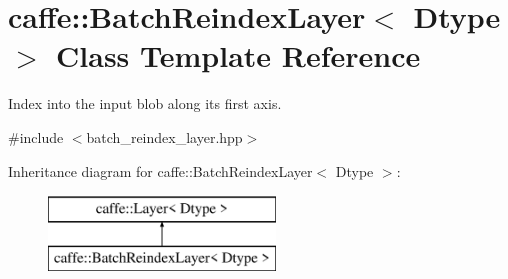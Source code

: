 \hypertarget{classcaffe_1_1BatchReindexLayer}{}\section{caffe\+:\+:Batch\+Reindex\+Layer$<$ Dtype $>$ Class Template Reference}
\label{classcaffe_1_1BatchReindexLayer}


Index into the input blob along its first axis.  




{\ttfamily \#include $<$batch\+\_\+reindex\+\_\+layer.\+hpp$>$}

Inheritance diagram for caffe\+:\+:Batch\+Reindex\+Layer$<$ Dtype $>$\+:\begin{figure}[H]
\begin{center}
\leavevmode
\includegraphics[height=2.000000cm]{classcaffe_1_1BatchReindexLayer}
\end{center}
\end{figure}
